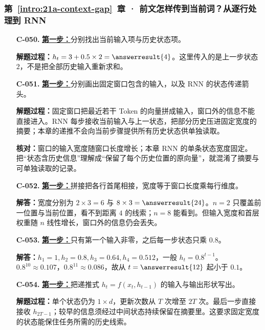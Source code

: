 \subsubsection*{第~\ref*{intro:21a-context-gap}~章 · 前文怎样传到当前词？从逐行处理到 RNN}
\begin{enumerate}[label={},leftmargin=4.8em,itemsep=4pt]
\item[\textbf{C-050.}] \leavevmode{}\label{solution:C-050}\label{solution:rnn-one-step}\hyperref[exercise:rnn-one-step]{\textbf{第一步：}}分别找出当前输入项与历史状态项。\par\nobreak
\textbf{解题过程：}$h_t=3+0.5\times2=\answerresult{4}$。这里传入的是上一步状态 $2$，不是把全部历史输入重新求和。
\item[\textbf{C-051.}] \leavevmode{}\label{solution:C-051}\label{solution:history-model-comparison}\hyperref[exercise:history-model-comparison]{\textbf{第一步：}}分别画出固定窗口包含的输入，以及 RNN 的状态传递箭头。\par\nobreak\textbf{解题过程：}固定窗口把最近若干 Token 的向量拼成输入，窗口外的信息不能直接进入。RNN 每步接收当前输入与上一状态，把部分历史压进固定宽度的摘要；本章的递推不会向当前步骤提供所有历史状态供单独读取。\par\textbf{核对：}窗口的输入宽度随窗口长度增长；本章 RNN 的单条状态宽度固定。把“状态含历史信息”理解成“保留了每个历史位置的原向量”，就混淆了摘要与可单独读取的记录。
\item[\textbf{C-052.}] \leavevmode{}\label{solution:C-052}\label{solution:window-input-width}\hyperref[exercise:window-input-width]{\textbf{第一步：}}拼接把各行首尾相接，宽度等于窗口长度乘每行维度。\par\nobreak
\textbf{解答：}宽度分别为 $2\times3=6$ 与 $8\times3=\answerresult{24}$。$n=2$ 只覆盖前一位置与当前位置，看不到距离 $4$ 的线索；$n=8$ 能看到。但输入宽度和首层权重随 $n$ 线性增长，窗口外的信息仍会丢失。
\item[\textbf{C-053.}] \leavevmode{}\label{solution:C-053}\label{solution:rnn-decay}\hyperref[exercise:rnn-decay]{\textbf{第一步：}}只有第一个输入非零，之后每一步状态只乘 $0.8$。\par\nobreak
\textbf{解答：}$h_1=1,h_2=0.8,h_3=0.64,h_4=0.512$，一般 $h_t=0.8^{t-1}$。$0.8^{10}\approx0.107$，$0.8^{11}\approx0.086$，故从 $t=\answerresult{12}$ 起小于 $0.1$。
\item[\textbf{C-054.}] \leavevmode{}\label{solution:C-054}\label{solution:rnn-state-scaling}\hyperref[exercise:rnn-state-scaling]{\textbf{第一步：}}把递推式 $h_t=f(x_t,h_{t-1})$ 的输入与输出形状写出。\par\nobreak\textbf{解题过程：}单个状态仍为 $1\times d$，更新次数从 $T$ 次增至 $2T$ 次。最后一步直接接收 $h_{2T-1}$；较早的信息须经过中间状态持续保留在摘要里。这要求固定宽度的状态能保住任务所需的历史线索。
\end{enumerate}
